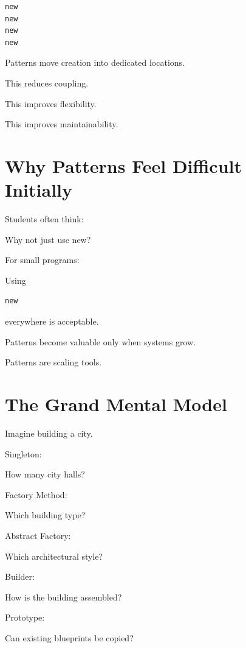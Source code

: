 \documentclass[11pt,a4paper]{book}
\begin{document}
\begin{verbatim}
new
new
new
new
\end{verbatim}

Patterns move creation into dedicated locations.

This reduces coupling.

This improves flexibility.

This improves maintainability.


\section{Why Patterns Feel Difficult Initially}

\begin{trap}

Students often think:

\begin{center}
Why not just use new?
\end{center}

\end{trap}

For small programs:

Using

\begin{verbatim}
new
\end{verbatim}

everywhere is acceptable.

Patterns become valuable only when systems grow.

Patterns are scaling tools.


\section{The Grand Mental Model}

\begin{mentalmodel}

Imagine building a city.

Singleton:

How many city halls?

Factory Method:

Which building type?

Abstract Factory:

Which architectural style?

Builder:

How is the building assembled?

Prototype:

Can existing blueprints be copied?

\end{mentalmodel}
\end{document}
